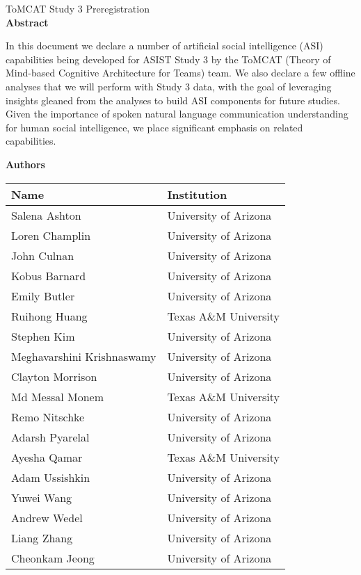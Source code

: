 \documentclass[oneside,9pt]{memoir}
\begin{document}
\thispagestyle{empty}
\begin{center}
    {\LARGE ToMCAT Study 3 Preregistration}\\
    \bigskip
    \textbf{Abstract}
\end{center}

    In this document we declare a number of artificial social intelligence
    (ASI) capabilities being developed for ASIST Study 3 by the ToMCAT (Theory
    of Mind-based Cognitive Architecture for Teams) team. We also declare a few
    offline analyses that we will perform with Study 3 data, with the goal of
    leveraging insights gleaned from the analyses to build ASI components for
    future studies. Given the importance of spoken natural language
    communication understanding for human social intelligence, we place
    significant emphasis on related capabilities.

\begin{center}

    \bigskip

    \textbf{Authors}

    \bigskip

    \begin{tabular}{ll}
        \toprule
        Name & Institution \\\midrule
        Salena Ashton & University of Arizona\\
        Loren Champlin & University of Arizona\\
        John Culnan & University of Arizona\\
        Kobus Barnard & University of Arizona\\
        Emily Butler & University of Arizona\\
        Ruihong Huang & Texas A\&M University \\
        Stephen Kim & University of Arizona\\
        Meghavarshini Krishnaswamy & University of Arizona\\
        Clayton Morrison & University of Arizona\\
        Md Messal Monem & Texas A\&M University \\
        Remo Nitschke & University of Arizona\\
        Adarsh Pyarelal & University of Arizona\\
        Ayesha Qamar & Texas A\&M University \\
        Adam Ussishkin& University of Arizona\\
        Yuwei Wang & University of Arizona\\
        Andrew Wedel & University of Arizona\\
        Liang Zhang & University of Arizona\\
        Cheonkam Jeong & University of Arizona\\
        \bottomrule
    \end{tabular}
\end{center}
\end{document}
